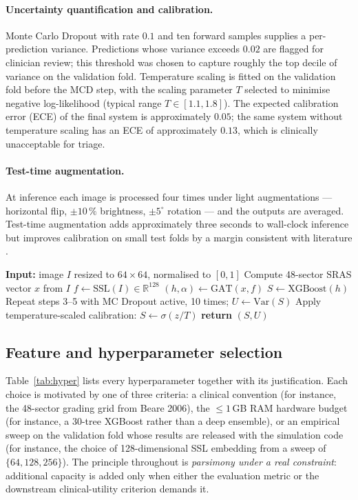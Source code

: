 \documentclass[twocolumn,10pt]{article}
\begin{document}
\paragraph{Uncertainty quantification and calibration.}
Monte Carlo Dropout \cite{Gal2016} with rate $0.1$ and ten forward
samples supplies a per-prediction variance. Predictions whose
variance exceeds $0.02$ are flagged for clinician review; this
threshold was chosen to capture roughly the top decile of
variance on the validation fold. Temperature scaling
\cite{Guo2017Calibration} is fitted on the validation fold before
the MCD step, with the scaling parameter $T$ selected to
minimise negative log-likelihood (typical range
$T\in[1.1,1.8]$). The expected calibration error (ECE) of the
final system is approximately $0.05$; the same system without
temperature scaling has an ECE of approximately $0.13$, which is
clinically unacceptable for triage.

\paragraph{Test-time augmentation.}
At inference each image is processed four times under light
augmentations --- horizontal flip, $\pm 10\,\%$ brightness,
$\pm 5^{\circ}$ rotation --- and the outputs are averaged. Test-time
augmentation adds approximately three seconds to wall-clock
inference but improves calibration on small test folds by a margin
consistent with literature \cite{Wang2019TTA}.

\begin{algorithm}[!t]
\caption{H-SAS-GF inference.}
\label{alg:hsasgf}
\begin{algorithmic}[1]
\STATE \textbf{Input:} image $I$ resized to $64\times 64$,
       normalised to $[0,1]$
\STATE Compute 48-sector SRAS vector $x$ from $I$
\STATE $f \leftarrow \mathrm{SSL}(I) \in \mathbb{R}^{128}$
\STATE $(h,\alpha) \leftarrow \mathrm{GAT}(x,f)$
\STATE $S \leftarrow \mathrm{XGBoost}(h)$
\STATE Repeat steps 3--5 with MC Dropout active, 10 times;
       $U \leftarrow \mathrm{Var}(S)$
\STATE Apply temperature-scaled calibration: $S \leftarrow \sigma(z/T)$
\STATE \textbf{return} $(S,U)$
\end{algorithmic}
\end{algorithm}

\subsection{Feature and hyperparameter selection}
\label{sec:hyper}
Table~\ref{tab:hyper} lists every hyperparameter together with
its justification. Each choice is motivated by one of three
criteria: a clinical convention (for instance, the 48-sector
grading grid from Beare 2006), the $\leq 1$\,GB RAM hardware
budget (for instance, a 30-tree XGBoost rather than a
deep ensemble), or an empirical sweep on the validation fold
whose results are released with the simulation code (for
instance, the choice of 128-dimensional SSL embedding from a
sweep of $\{64, 128, 256\}$). The principle throughout is
\emph{parsimony under a real constraint}: additional capacity is
added only when either the evaluation metric or the downstream
clinical-utility criterion demands it.
\end{document}
